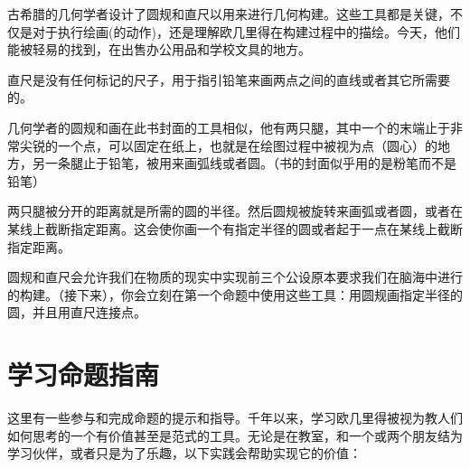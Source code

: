 \documentclass[
]{book}
\begin{document}
古希腊的几何学者设计了圆规和直尺以用来进行几何构建。这些工具都是关键，不仅是对于执行绘画(的动作)，还是理解欧几里得在构建过程中的描绘。今天，他们能被轻易的找到，在出售办公用品和学校文具的地方。

直尺是没有任何标记的尺子，用于指引铅笔来画两点之间的直线或者其它所需要的。

几何学者的圆规和画在此书封面的工具相似，他有两只腿，其中一个的末端止于非常尖锐的一个点，可以固定在纸上，也就是在绘图过程中被视为点（圆心）的地方，另一条腿止于铅笔，被用来画弧线或者圆。（书的封面似乎用的是粉笔而不是铅笔）

两只腿被分开的距离就是所需的圆的半径。然后圆规被旋转来画弧或者圆，或者在某线上截断指定距离。这会使你画一个有指定半径的圆或者起于一点在某线上截断指定距离。

圆规和直尺会允许我们在物质的现实中实现前三个公设原本要求我们在脑海中进行的构建。（接下来），你会立刻在第一个命题中使用这些工具：用圆规画指定半径的圆，并且用直尺连接点。

\hypertarget{ux5b66ux4e60ux547dux9898ux6307ux5357}{%
\section*{学习命题指南}\label{ux5b66ux4e60ux547dux9898ux6307ux5357}}

这里有一些参与和完成命题的提示和指导。千年以来，学习欧几里得被视为教人们如何思考的一个有价值甚至是范式的工具。无论是在教室，和一个或两个朋友结为学习伙伴，或者只是为了乐趣，以下实践会帮助实现它的价值：
\end{document}

